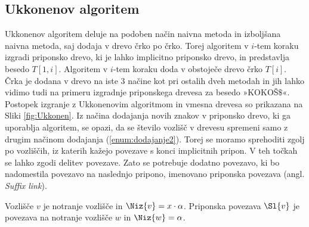 \subsection{Ukkonenov algoritem}
Ukkonenov algoritem deluje na podoben način naivna metoda in izboljšana naivna metoda, saj dodaja v drevo črko po črko. Torej algoritem v $i$-tem koraku izgradi priponsko drevo, ki je lahko implicitno priponsko drevo, in predstavlja besedo $T[1,i]$. Algoritem v $i$-tem koraku doda v obstoječe drevo črko $T[i]$. Črka je dodana v drevo na iste 3 načine kot pri ostalih dveh metodah in jih lahko vidimo tudi na primeru izgradnje priponskega drevesa za besedo »KOKOŠ$\$$«. Postopek izgranje z Ukkonenovim algoritmom in vmesna drevesa so prikazana na Sliki \ref{fig:Ukkonen}. Iz načina dodajanja novih znakov v priponsko drevo, ki ga uporablja algoritem, se opazi, da se število vozlišč v drevesu spremeni samo z drugim načinom dodajanja (\ref{enum:dodajanje2}). Torej se moramo sprehoditi zgolj po vozliščih, iz katerih kažejo povezave s konci implicitnih pripon. V teh točkah se lahko zgodi delitev povezave. Zato se potrebuje dodatno povezavo, ki bo nadomestila povezavo na naslednjo pripono, imenovano priponska povezava (angl. \textit{Suffix link}). 

\begin{defi}\label{def:sl}
    Vozlišče $v$ je notranje vozlišče in $\Niz{v}=x\cdot\alpha$. Priponska povezava $\Sl{v}$ je povezava na notranje vozlišče $w$ in $\Niz{w}=\alpha$.
\end{defi}

